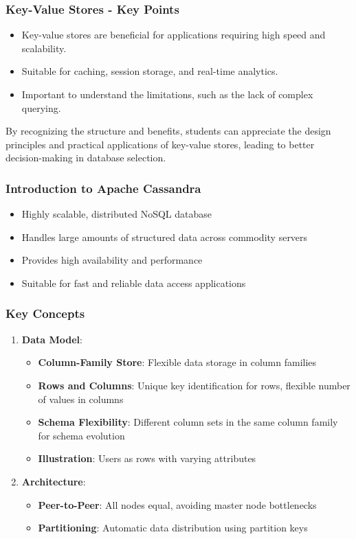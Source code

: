 \documentclass[aspectratio=169]{beamer}
\begin{document}
\begin{frame}[fragile]
    \frametitle{Key-Value Stores - Key Points}
    \begin{itemize}
        \item Key-value stores are beneficial for applications requiring high speed and scalability.
        \item Suitable for caching, session storage, and real-time analytics.
        \item Important to understand the limitations, such as the lack of complex querying.
    \end{itemize}

    By recognizing the structure and benefits, students can appreciate the design principles and practical applications of key-value stores, leading to better decision-making in database selection.
\end{frame}

\begin{frame}[fragile]
    \frametitle{Introduction to Apache Cassandra}
    \begin{itemize}
        \item Highly scalable, distributed NoSQL database
        \item Handles large amounts of structured data across commodity servers
        \item Provides high availability and performance
        \item Suitable for fast and reliable data access applications
    \end{itemize}
\end{frame}

\begin{frame}[fragile]
    \frametitle{Key Concepts}
    \begin{enumerate}
        \item \textbf{Data Model}:
        \begin{itemize}
            \item \textbf{Column-Family Store}: Flexible data storage in column families
            \item \textbf{Rows and Columns}: Unique key identification for rows, flexible number of values in columns
            \item \textbf{Schema Flexibility}: Different column sets in the same column family for schema evolution
            \item \textbf{Illustration}: Users as rows with varying attributes
        \end{itemize}
        
        \item \textbf{Architecture}:
        \begin{itemize}
            \item \textbf{Peer-to-Peer}: All nodes equal, avoiding master node bottlenecks
            \item \textbf{Partitioning}: Automatic data distribution using partition keys
        \end{itemize}
    \end{enumerate}
\end{frame}
\end{document}
